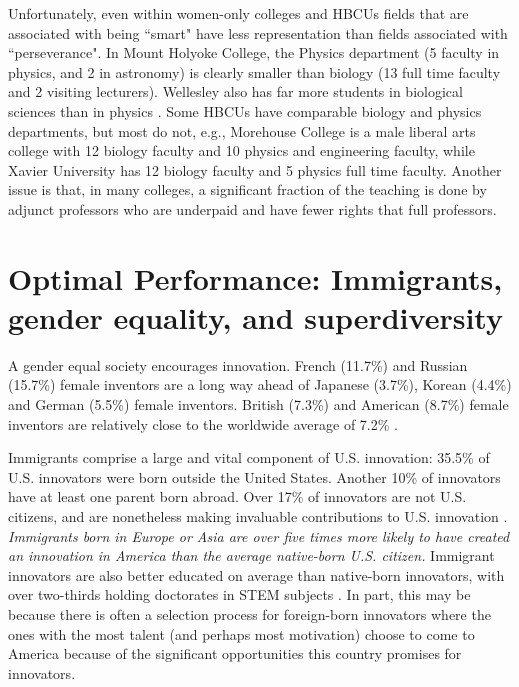 \documentclass[utf8]{frontiersSCNS} %
\begin{document}
Unfortunately, even within women-only colleges and HBCUs fields that are associated with being ``smart" have less representation than fields associated with ``perseverance". In Mount Holyoke College, the Physics department (5 faculty in physics, and 2 in astronomy) is clearly smaller than biology (13 full time faculty and 2 visiting lecturers). Wellesley  also has far more students in biological sciences than in physics \citep{Wes}. Some HBCUs have comparable biology and physics departments, but most do not, e.g., Morehouse College is a male liberal arts college with 12 biology faculty and 10 physics and engineering faculty, while Xavier University has 12 biology faculty and 5 physics full time faculty. Another issue is that, in many colleges, a significant fraction of the teaching is done by adjunct professors who are underpaid and have fewer rights that full professors. %

\section{Optimal Performance: Immigrants, gender equality, and superdiversity}
\label{Sec5}
A gender equal society encourages innovation. French (11.7\%) and Russian (15.7\%) female inventors are a long way ahead of Japanese (3.7\%), Korean (4.4\%) and German (5.5\%) female inventors. British (7.3\%) and American (8.7\%) female inventors are relatively close to the worldwide average of 7.2\% \citep{nager2016demographics}.

Immigrants comprise a large and vital component of U.S. innovation: 35.5\% of U.S. innovators were born outside the United States. Another 10\% of innovators have at least one parent born abroad. Over 17\% of innovators are not U.S. citizens, and are nonetheless making invaluable contributions to U.S. innovation \citep{nager2016demographics}. {\it Immigrants born in Europe or Asia are over five times more likely to have created an innovation in America than the average native-born U.S. citizen.} Immigrant innovators are also better educated on average than native-born innovators, with over two-thirds holding doctorates in STEM subjects \citep{nager2016demographics}. In part, this may be because there is often a selection process for foreign-born innovators where the ones with the most talent (and perhaps most motivation) choose to come to America because of the significant opportunities this country promises for innovators. 
\end{document}
